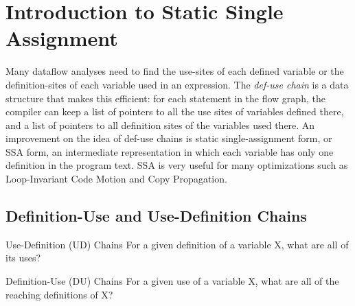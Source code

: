 \newpage

\newpage
\newpage
\newpage

\section{Introduction to Static Single Assignment}

Many dataflow analyses need to find the use-sites of each defined variable or the definition-sites of each variable used in an expression. The \textit{def-use chain} is a data structure that makes this efficient: for each statement in the flow graph, the compiler can keep a list of pointers to all the use sites of variables defined there, and a list of pointers to all definition sites of the variables used there. An improvement on the idea of def-use chains is static single-assignment form, or SSA form, an intermediate representation in which each variable has only one definition in the program text. SSA is very useful for many optimizations such as Loop-Invariant Code Motion and Copy Propagation.



\subsection{Definition-Use and Use-Definition Chains}


\begin{definition}{Use-Definition (UD) Chains}
For a given definition of a variable X, what are all of its uses?

\end{definition}



\begin{definition}{Definition-Use (DU) Chains}
For a given use of a variable X, what are all of the reaching definitions of X?

\end{definition}



